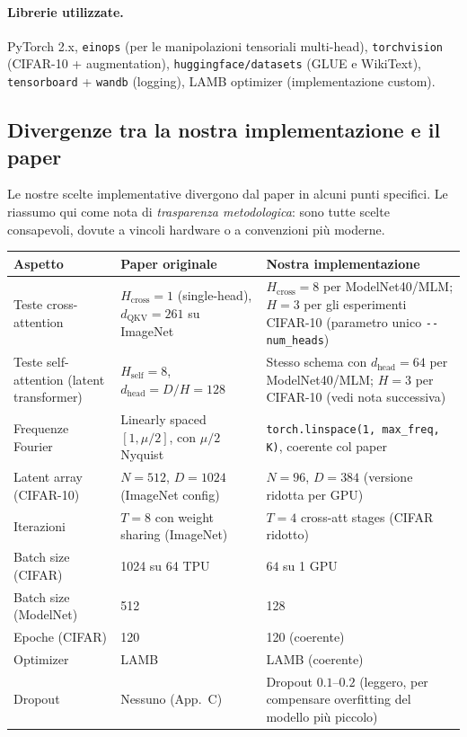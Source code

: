 \documentclass[
  11pt,
]{article}
\begin{document}
\paragraph{Librerie utilizzate.} PyTorch 2.x, \texttt{einops} (per le manipolazioni tensoriali multi-head), \texttt{torchvision} (CIFAR-10 + augmentation), \texttt{huggingface/datasets} (GLUE e WikiText), \texttt{tensorboard} + \texttt{wandb} (logging), LAMB optimizer (implementazione custom).

\subsection{Divergenze tra la nostra implementazione e il paper}
\label{sec:progetto-divergenze}

Le nostre scelte implementative divergono dal paper in alcuni punti specifici. Le riassumo qui come nota di \emph{trasparenza metodologica}: sono tutte scelte consapevoli, dovute a vincoli hardware o a convenzioni più moderne.

\begin{center}
{\small
\begin{tabular}{@{}p{4cm}p{5cm}p{5cm}@{}}
\toprule
\textbf{Aspetto} & \textbf{Paper originale} & \textbf{Nostra implementazione} \\
\midrule
Teste cross-attention & $H_{\text{cross}} = 1$ (single-head), $d_{\text{QKV}} = 261$ su ImageNet & $H_{\text{cross}} = 8$ per ModelNet40/MLM; $H = 3$ per gli esperimenti CIFAR-10 (parametro unico \texttt{-{}-num\_heads}) \\
Teste self-attention (latent transformer) & $H_{\text{self}} = 8$, $d_{\text{head}} = D/H = 128$ & Stesso schema con $d_{\text{head}} = 64$ per ModelNet40/MLM; $H=3$ per CIFAR-10 (vedi nota successiva) \\
Frequenze Fourier & Linearly spaced $[1, \mu/2]$, con $\mu/2$ Nyquist & \texttt{torch.linspace(1, max\_freq, K)}, coerente col paper \\
Latent array (CIFAR-10) & $N=512$, $D=1024$ (ImageNet config) & $N=96$, $D=384$ (versione ridotta per GPU) \\
Iterazioni & $T=8$ con weight sharing (ImageNet) & $T=4$ cross-att stages (CIFAR ridotto) \\
Batch size (CIFAR) & 1024 su 64 TPU & $64$ su 1 GPU \\
Batch size (ModelNet) & 512 & 128 \\
Epoche (CIFAR) & 120 & 120 (coerente) \\
Optimizer & LAMB & LAMB (coerente) \\
Dropout & Nessuno (App.\ C) & Dropout $0.1$--$0.2$ (leggero, per compensare overfitting del modello più piccolo) \\
\bottomrule
\end{tabular}
}
\end{center}
\end{document}
